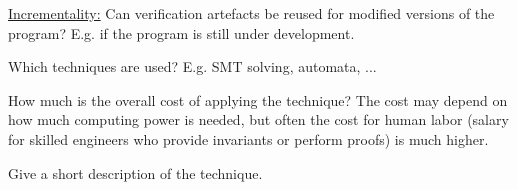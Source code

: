 \documentclass[a4paper]{article}
\begin{document}
\begin{landscape}
\begin{minipage}[t]{0.2\linewidth}
\begin{betterlist}
\begin{betterlist}
			\item \underline{Incrementality:} Can verification artefacts be reused for modified versions of the program? E.g. if the program is still under development.

			\item Which techniques are used? E.g. SMT solving, automata, ...

			\item How much is the overall cost of applying the technique? The cost may depend on how much computing power is needed, but often the cost for human labor (salary for skilled engineers who provide invariants or perform proofs) is much higher.

		\end{betterlist}
	\end{betterlist}
\end{minipage}
\begin{minipage}[t]{0.2\linewidth}
	\raggedright
	\begin{betterlist}
		\item Give a short description of the technique.


\end{betterlist}
\end{minipage}
\end{landscape}
\end{document}
